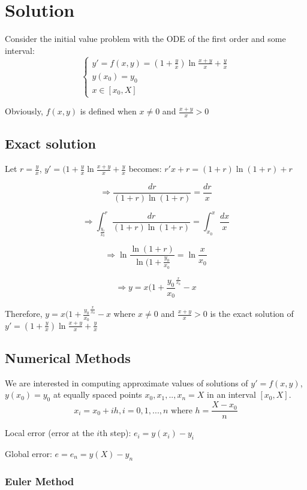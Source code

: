 \section{Solution}
\label{chapter1}

Consider the initial value problem with the ODE of the first order and some interval:
$$\left\lbrace \begin{array}{ll} y'=f(x,y)=(1 + \frac{y}{x}) \ln \frac{x+y}{x} + \frac{y}{x} \\ y(x_0)=y_0 \\ x\in [x_0, X] \end{array}\right.$$

Obviously, $f(x,y)$ is defined when $x\neq 0$ and $\frac{x+y}{x} > 0$

\subsection{Exact solution}

Let $r = \frac{y}{x}$, $y'=(1+\frac{y}{x}\ln \frac{x+y}{x} + \frac{y}{x}$ becomes: $r'x+r=(1+r)\ln (1+r) + r$

$$\Rightarrow \frac{dr}{(1+r)\ln (1+r)}=\frac{dr}{x}$$

$$\Rightarrow \int_{\frac{y_0}{x_0}}^{r} \frac{dr}{(1+r)\ln (1+r)} = \int_{x_0}^{x}\frac{dx}{x}$$

$$\Rightarrow \ln \frac{\ln (1+r)}{\ln (1+\frac{y_0}{x_0}} = \ln \frac{x}{x_0}$$

$$\Rightarrow y = x(1+\frac{y_0}{x_0}^\frac{x}{x_0} - x$$

Therefore, $y=x(1+\frac{y_0}{x_0}^\frac{x}{x_0}-x$ where $x\neq 0$ and $\frac{x+y}{x} > 0$ is the exact solution of $y'=(1+\frac{y}{x})\ln \frac{x+y}{x} + \frac{y}{x}$

\subsection{Numerical Methods}

We are interested in computing approximate values of solutions of $y'=f(x,y)$, $y(x_0)=y_0$ at equally spaced points $x_0, x_1,..,x_n=X$ in an interval $[x_0, X]$. 
$$x_i = x_0 + ih, i = 0, 1,...,n \text{ where } h=\frac{X-x_0}{n}$$

Local error (error at the $i$th step): $e_i = y(x_i)-y_i$

Global error: $e = e_n = y(X)-y_n$

\subsubsection{Euler Method}

